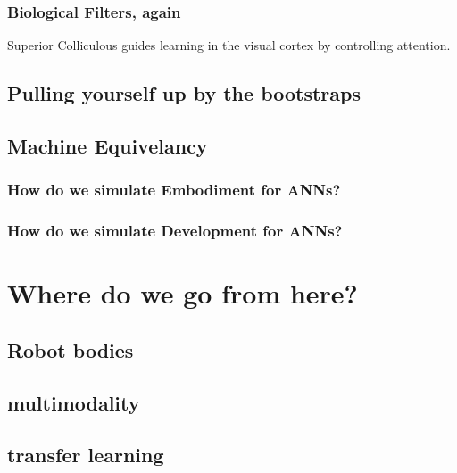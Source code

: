 \subsubsection{Biological Filters, again}
Superior Colliculous guides learning in the visual cortex by controlling attention.
\subsection{Pulling yourself up by the bootstraps}

\subsection{Machine Equivelancy}
\subsubsection{How do we simulate Embodiment for ANNs?}
\subsubsection{How do we simulate Development for ANNs?}

\section{Where do we go from here?}
\subsection{Robot bodies}
\subsection{multimodality}
\subsection{transfer learning}


